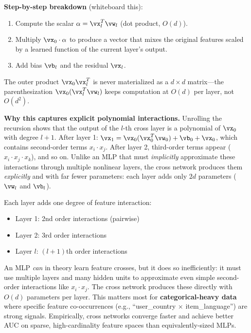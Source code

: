 \textbf{Step-by-step breakdown} (whiteboard this):
\begin{enumerate}
    \item Compute the scalar $\alpha = \vx_l^T \vw_l$ (dot product, $O(d)$).
    \item Multiply $\vx_0 \cdot \alpha$ to produce a vector that mixes the original features scaled by a learned function of the current layer's output.
    \item Add bias $\vb_l$ and the residual $\vx_l$.
\end{enumerate}
The outer product $\vx_0 \vx_l^T$ is never materialized as a $d \times d$ matrix---the parenthesization $\vx_0 (\vx_l^T \vw_l)$ keeps computation at $O(d)$ per layer, not $O(d^2)$.

\textbf{Why this captures explicit polynomial interactions.} Unrolling the recursion shows that the output of the $l$-th cross layer is a polynomial of $\vx_0$ with degree $l+1$. After layer 1: $\vx_1 = \vx_0 (\vx_0^T \vw_0) + \vb_0 + \vx_0$, which contains second-order terms $x_i \cdot x_j$. After layer 2, third-order terms appear ($x_i \cdot x_j \cdot x_k$), and so on. Unlike an MLP that must \textit{implicitly} approximate these interactions through multiple nonlinear layers, the cross network produces them \textit{explicitly} and with far fewer parameters: each layer adds only $2d$ parameters ($\vw_l$ and $\vb_l$).

Each layer adds one degree of feature interaction:
\begin{itemize}
    \item Layer 1: 2nd order interactions (pairwise)
    \item Layer 2: 3rd order interactions
    \item Layer $l$: $(l+1)$th order interactions
\end{itemize}

\begin{keyinsight}
An MLP \textit{can} in theory learn feature crosses, but it does so inefficiently: it must use multiple layers and many hidden units to approximate even simple second-order interactions like $x_i \cdot x_j$. The cross network produces these directly with $O(d)$ parameters per layer. This matters most for \textbf{categorical-heavy data} where specific feature co-occurrences (e.g., ``user\_country $\times$ item\_language'') are strong signals. Empirically, cross networks converge faster and achieve better AUC on sparse, high-cardinality feature spaces than equivalently-sized MLPs.
\end{keyinsight}

